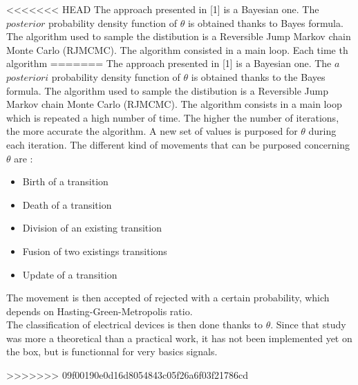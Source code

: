<<<<<<< HEAD
The approach presented in [1] is a Bayesian one. The $posterior$ probability density function of $\theta$ is obtained thanks to Bayes formula. The algorithm used to sample the distibution is a Reversible Jump Markov chain Monte Carlo (RJMCMC). The algorithm consisted in a main loop. Each time th algorithm
=======
The approach presented in [1] is a Bayesian one. The $a$ $posteriori$ probability density function of $\theta$ is obtained thanks to the Bayes formula. The algorithm used to sample the distibution is a Reversible Jump Markov chain Monte Carlo (RJMCMC). The algorithm consists in a main loop which is repeated a high number of time. The higher the number of iterations, the more accurate the algorithm. A new set of values is purposed for $\theta$ during each iteration. The different kind of movements that can be purposed concerning $\theta$ are :
\begin{itemize}
\item Birth of a transition
\item Death of a transition
\item Division of an existing transition
\item Fusion of two existings transitions
\item Update of a transition
\end{itemize}
The movement is then accepted of rejected with a certain probability, which depends on Hasting-Green-Metropolis ratio. 
\\

The classification of electrical devices is then done thanks to $\theta$. Since that study was more a theoretical than a practical work, it has not been implemented yet on the box, but is functionnal for very basics signals.




















>>>>>>> 09f00190e0d16d8054843c05f26a6f03f21786cd
